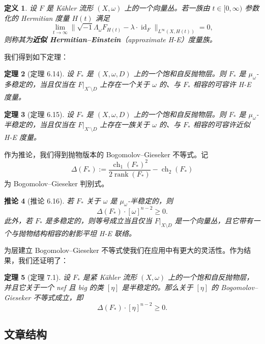 \documentclass[12pt,a4paper]{article}
\newtheorem{theorem}{定理}[section]
\newtheorem{corollary}[theorem]{推论}
\newtheorem{definition}[theorem]{定义}
\newcommand{\ch}{\operatorname{ch}}
\newcommand{\rank}{\operatorname{rank}}
\newcommand{\Id}{\operatorname{id}}
\begin{document}
\begin{definition}
设 \(F\) 是 Kähler 流形 \((X,\omega)\) 上的一个向量丛。若一族由 \(t\in[0,\infty)\) 参数化的 Hermitian 度量 \(H(t)\) 满足
\[
\lim_{t\to\infty}\bigl\|\sqrt{-1}\Lambda_\omega F_{H(t)}-\lambda\cdot \Id_F\bigr\|_{L^\infty(X,H(t))}=0,
\]
则称其为\textbf{近似 Hermitian--Einstein}（approximate H-E）度量族。
\end{definition}

我们得到如下定理：

\begin{theorem}[定理 6.14]
设 \(F_*\) 是 \((X,\omega,D)\) 上的一个饱和自反抛物层。则 \(F_*\) 是 \(\mu_\omega\)-多稳定的，当且仅当在 \(F|_{X^\circ\setminus D}\) 上存在一个关于 \(\omega\) 的、与 \(F_*\) 相容的可容许 H-E 度量。
\end{theorem}

\begin{theorem}[定理 6.15]
设 \(F_*\) 是 \((X,\omega,D)\) 上的一个饱和自反抛物层。则 \(F_*\) 是 \(\mu_\omega\)-半稳定的，当且仅当在 \(F|_{X^\circ\setminus D}\) 上存在一族关于 \(\omega\) 的、与 \(F_*\) 相容的可容许近似 H-E 度量。
\end{theorem}

作为推论，我们得到抛物版本的 Bogomolov--Gieseker 不等式。记
\[
\Delta(F_*):=\frac{\ch_1(F_*)^2}{2\rank(F_*)}-\ch_2(F_*)
\]
为 Bogomolov--Gieseker 判别式。

\begin{corollary}[推论 6.16]
若 \(F_*\) 关于 \(\omega\) 是 \(\mu_\omega\)-半稳定的，则
\[
\Delta(F_*)\cdot [\omega]^{n-2}\ge 0.
\]
此外，若 \(F_*\) 是多稳定的，则等号成立当且仅当 \(F|_{X\setminus D}\) 是一个向量丛，且它带有一个与抛物结构相容的射影平坦 H-E 联络。
\end{corollary}

为层建立 Bogomolov--Gieseker 不等式使我们在应用中有更大的灵活性。作为结果，我们还证明了：

\begin{theorem}[定理 7.1]
设 \(F_*\) 是紧 Kähler 流形 \((X,\omega)\) 上的一个饱和自反抛物层，并且它关于一个 nef 且 big 的类 \([\eta]\) 是半稳定的。那么关于 \([\eta]\) 的 Bogomolov--Gieseker 不等式成立，即
\[
\Delta(F_*)\cdot [\eta]^{n-2}\ge 0.
\]
\end{theorem}

\subsection{文章结构}
\end{document}
